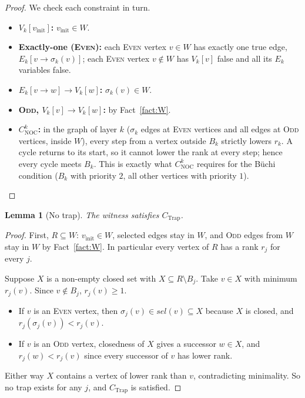 \documentclass{article}
\newtheorem{lemma}{Lemma}
\theoremstyle{definition}
\theoremstyle{remark}
\newcommand{\Even}{\textsc{Even}}
\newcommand{\Odd}{\textsc{Odd}}
\newcommand{\vinit}{v_{\mathrm{init}}}
\newcommand{\sel}{\mathit{sel}}
\newcommand{\CNOC}{C_{\mathrm{NOC}}}
\newcommand{\CTrap}{C_{\mathrm{Trap}}}
\begin{document}
\begin{proof}
We check each constraint in turn.
\begin{itemize}
  \item \textbf{$V_k[\vinit]$:} $\vinit \in W$.
  \item \textbf{Exactly-one (\Even{}):} each \Even{} vertex $v \in W$ has
    exactly one true edge, $E_k[v \to \sigma_k(v)]$; each \Even{} vertex
    $v \notin W$ has $V_k[v]$ false and all its $E_k$ variables false.
  \item \textbf{$E_k[v \to w] \rightarrow V_k[w]$:} $\sigma_k(v) \in W$.
  \item \textbf{\Odd{}, $V_k[v] \rightarrow V_k[w]$:} by Fact~\ref{fact:W}.
  \item \textbf{$\CNOC^{k}$:} in the graph of layer $k$ ($\sigma_k$ edges at
    \Even{} vertices and all edges at \Odd{} vertices, inside $W$), every step
    from a vertex outside $B_k$ strictly lowers $r_k$. A cycle returns to its
    start, so it cannot lower the rank at every step; hence every cycle meets
    $B_k$. This is exactly what $\CNOC^{k}$ requires for the B\"uchi
    condition ($B_k$ with priority $2$, all other vertices with priority $1$).
    \qedhere
\end{itemize}
\end{proof}

\begin{lemma}[No trap]\label{lem:notrap}
The witness satisfies $\CTrap$.
\end{lemma}

\begin{proof}
First, $R \subseteq W$: $\vinit \in W$, selected edges stay in $W$, and
\Odd{} edges from $W$ stay in $W$ by Fact~\ref{fact:W}. In particular every
vertex of $R$ has a rank $r_j$ for every $j$.

Suppose $X$ is a non-empty closed set with $X \subseteq R \setminus B_j$.
Take $v \in X$ with minimum $r_j(v)$. Since $v \notin B_j$, $r_j(v) \ge 1$.
\begin{itemize}
  \item If $v$ is an \Even{} vertex, then $\sigma_j(v) \in \sel(v) \subseteq X$
    because $X$ is closed, and $r_j(\sigma_j(v)) < r_j(v)$.
  \item If $v$ is an \Odd{} vertex, closedness of $X$ gives a successor
    $w \in X$, and $r_j(w) < r_j(v)$ since every successor of $v$ has lower
    rank.
\end{itemize}
Either way $X$ contains a vertex of lower rank than $v$, contradicting
minimality. So no trap exists for any $j$, and $\CTrap$ is satisfied.
\end{proof}
\end{document}
